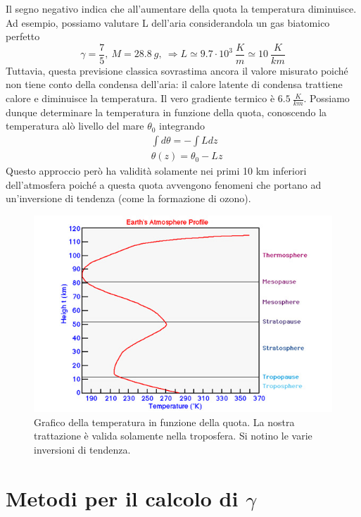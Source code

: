 \documentclass[10pt,a4paper]{article}
\begin{document}
Il segno negativo indica che all'aumentare della quota la temperatura diminuisce.\\
Ad esempio, possiamo valutare L dell'aria considerandola un gas biatomico perfetto
\[\gamma = \frac{7}{5},\ M = 28.8\ g,\ \Rightarrow L \simeq 9.7\cdot 10^3\ \frac{K}{m} \simeq 10\ \frac{K}{km}\]
Tuttavia, questa previsione classica sovrastima ancora il valore misurato poiché non tiene conto della condensa dell'aria: il calore latente di condensa trattiene calore e diminuisce la temperatura. Il vero gradiente termico è $6.5\ \frac{K}{km}$. Possiamo dunque determinare la temperatura in funzione della quota, conoscendo la temperatura alò livello del mare $\theta_0$ integrando 
\begin{align*}
	&\int d\theta = -\int L dz\\
	&\theta (z) = \theta_0 - L z
\end{align*}
Questo approccio però ha validità solamente nei primi 10 km inferiori dell'atmosfera poiché a questa quota avvengono fenomeni che portano ad un'inversione di tendenza (come la formazione di ozono). 
\begin{figure}[h!]
	\centering
	\includegraphics[width=0.6\linewidth]{"../images/temperatura atmosferica"}
	\caption{Grafico della temperatura in funzione della quota. La nostra trattazione è valida solamente nella troposfera. Si notino le varie inversioni di tendenza.}
	\label{fig:temperatura-atmosferica}
\end{figure}
\FloatBarrier
\section{Metodi per il calcolo di $\gamma$}
\end{document}
